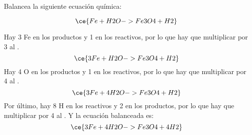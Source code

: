 Balancea la siguiente ecuación química:

\[
    \ce{Fe + H2O -> Fe3O4 + H2}
\]

\begin{solutionbox}{6.5cm}
    Hay 3 Fe en los productos y 1 en los reactivos, por lo que hay que multiplicar por 3 al .
    \[
        \ce{3Fe + H2O -> Fe3O4 + H2}
    \]
    Hay 4 O en los productos y 1 en los reactivos, por lo que hay que multiplicar por 4 al .
    \[
        \ce{3Fe + 4H2O -> Fe3O4 + H2}
    \]
    Por último, hay 8 H en los reactivos y 2 en los productos, por lo que hay que multiplicar por 4 al . Y la ecuación balanceada es:
    \[
        \ce{3Fe + 4H2O -> Fe3O4 + 4H2}
    \]
\end{solutionbox}